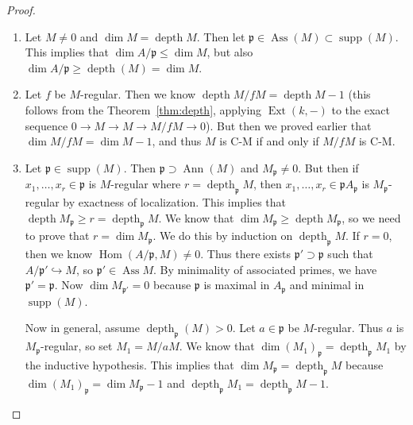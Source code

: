 \documentclass[leqno, openany]{memoir}
\theoremstyle{definition}
\theoremstyle{remark}
\theoremstyle{plain}
\theoremstyle{definition}
\theoremstyle{remark}
\newcommand{\mf}[1]{\mathfrak{#1}}
\DeclareMathOperator{\Hom}{Hom}
\DeclareMathOperator{\supp}{supp}
\DeclareMathOperator{\Ext}{Ext}
\DeclareMathOperator{\Ann}{Ann}
\DeclareMathOperator{\Ass}{Ass}
\DeclareMathOperator{\dpth}{depth}
\begin{document}
\begin{proof}
    \begin{enumerate}
        \item Let $M \neq 0$ and $\dim M = \dpth M$. Then let $\mf{p} \in \Ass(M) \subset \supp(M)$. This implies that $\dim A/\mf{p} \leq \dim M$, but also $\dim A/\mf{p} \geq \dpth(M) = \dim M$.
        \item Let $f$ be $M$-regular. Then we know $\dpth M/fM = \dpth M - 1$ (this follows from the Theorem~\ref{thm:depth}, applying $\Ext(k,-)$ to the exact sequence $0 \to M \to M \to M/fM \to 0$). But then we proved earlier that $\dim M/fM = \dim M - 1$, and thus $M$ is C-M if and only if $M/fM$ is C-M.
        \item Let $\mf{p} \in \supp(M)$. Then $\mf{p} \supset \Ann(M)$ and $M_{\mf{p}} \neq 0$. But then if $x_1, \ldots, x_r \in \mf{p}$ is $M$-regular where $r = \dpth_{\mf{p}} M$, then $x_1, \ldots, x_r \in \mf{p} A_{\mf{p}}$ is $M_{\mf{p}}$-regular by exactness of localization. This implies that $\dpth M_{\mf{p}} \geq r = \dpth_{\mf{p}} M$. We know that $\dim M_{\mf{p}} \geq \dpth M_{\mf{p}}$, so we need to prove that $r = \dim M_{\mf{p}}$. We do this by induction on $\dpth_{\mf{p}} M$. If $r = 0$, then we know $\Hom(A/\mf{p}, M) \neq 0$. Thus there exists $\mf{p}' \supset \mf{p}$ such that $A/\mf{p}' \hookrightarrow M$, so $\mf{p}' \in \Ass M$. By minimality of associated primes, we have $\mf{p}' = \mf{p}$. Now $\dim M_{\mf{p}'} = 0$ because $\mf{p}$ is maximal in $A_{\mf{p}}$ and minimal in $\supp(M)$.

            Now in general, assume $\dpth_{\mf{p}}(M) > 0$. Let $a \in \mf{p}$ be $M$-regular. Thus $a$ is $M_{\mf{p}}$-regular, so set $M_1 = M/aM$. We know that $\dim (M_1)_{\mf{p}} = \dpth_{\mf{p}} M_1$ by the inductive hypothesis. This implies that $\dim M_{\mf{p}} = \dpth_{\mf{p}} M$ because $\dim (M_1)_{\mf{p}} = \dim M_{\mf{p}} - 1$ and $\dpth_{\mf{p}} M_1 = \dpth_{\mf{p}} M - 1$. \qedhere
    \end{enumerate}
\end{proof}
\end{document}

